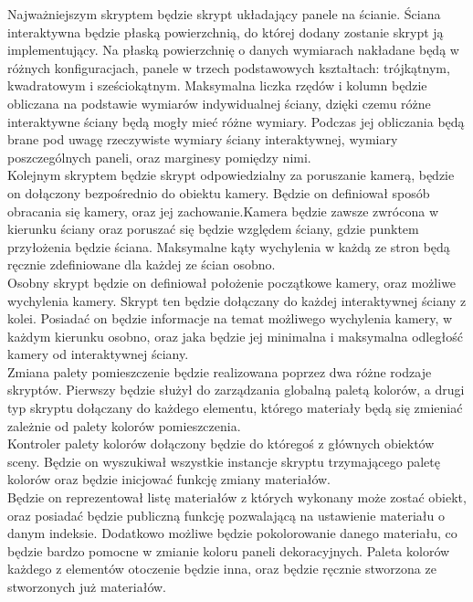 \documentclass{article} %
\begin{document}
        Najważniejszym skryptem będzie skrypt układający panele na ścianie. Ściana interaktywna będzie płaską powierzchnią, do której dodany zostanie skrypt ją implementujący. Na płaską powierzchnię o danych wymiarach nakładane będą w różnych konfiguracjach, panele w trzech podstawowych kształtach: trójkątnym, kwadratowym i sześciokątnym. Maksymalna liczka rzędów i kolumn będzie obliczana na podstawie wymiarów indywidualnej ściany, dzięki czemu różne interaktywne ściany będą mogły mieć różne wymiary. Podczas jej obliczania będą brane pod uwagę rzeczywiste wymiary ściany interaktywnej, wymiary poszczególnych paneli, oraz marginesy pomiędzy nimi.
        \\
        
        Kolejnym skryptem będzie skrypt odpowiedzialny za poruszanie kamerą, będzie on dołączony bezpośrednio do obiektu kamery. Będzie on definiował sposób obracania się kamery, oraz jej zachowanie.Kamera będzie zawsze zwrócona w kierunku ściany oraz poruszać się będzie względem ściany, gdzie punktem przyłożenia będzie ściana. Maksymalne kąty wychylenia w każdą ze stron będą ręcznie zdefiniowane dla każdej ze ścian osobno.
        \\
        
        Osobny skrypt będzie on definiował położenie początkowe kamery, oraz możliwe wychylenia kamery. Skrypt ten będzie dołączany do każdej interaktywnej ściany z kolei. Posiadać on będzie informacje na temat możliwego wychylenia kamery, w każdym kierunku osobno, oraz jaka będzie jej minimalna i maksymalna odległość kamery od interaktywnej ściany. 
        \\

        Zmiana palety pomieszczenie będzie realizowana poprzez dwa różne rodzaje skryptów. Pierwszy będzie służył do zarządzania globalną paletą kolorów, a drugi typ skryptu dołączany do każdego elementu, którego materiały będą się zmieniać zależnie od palety kolorów pomieszczenia. 
        \\

        Kontroler palety kolorów dołączony będzie do któregoś z głównych obiektów sceny. Będzie on wyszukiwał wszystkie instancje skryptu trzymającego paletę kolorów oraz będzie inicjować funkcję zmiany materiałów.
        \\
        
        Będzie on reprezentował listę materiałów z których wykonany może zostać obiekt, oraz posiadać będzie publiczną funkcję pozwalającą na ustawienie materiału o danym indeksie. Dodatkowo możliwe będzie pokolorowanie danego materiału, co będzie bardzo pomocne w zmianie koloru paneli dekoracyjnych. Paleta kolorów każdego z elementów otoczenie będzie inna, oraz będzie ręcznie stworzona ze stworzonych już materiałów.
        \\
        
\end{document}
